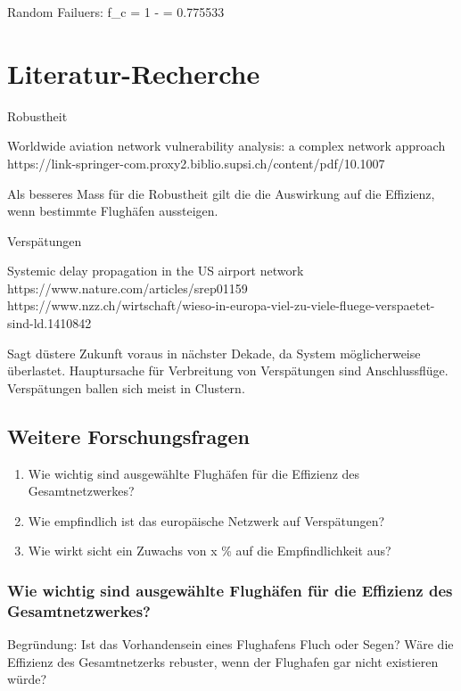 Random Failuers: f_c = 1 -  = 0.775533


\section{Literatur-Recherche}
\label{subsec:literature-research}

Robustheit

\guillemotleft Worldwide aviation network vulnerability analysis: a complex network approach \guillemotright
https://link-springer-com.proxy2.biblio.supsi.ch/content/pdf/10.1007%

Als besseres Mass für die Robustheit gilt die die Auswirkung auf die Effizienz, wenn bestimmte Flughäfen aussteigen.


Verspätungen

\guillemotleft Systemic delay propagation in the US airport network \guillemotright
https://www.nature.com/articles/srep01159
https://www.nzz.ch/wirtschaft/wieso-in-europa-viel-zu-viele-fluege-verspaetet-sind-ld.1410842

Sagt düstere Zukunft voraus in nächster Dekade, da System möglicherweise überlastet.
Hauptursache für Verbreitung von Verspätungen sind Anschlussflüge.
Verspätungen ballen sich meist in Clustern.



\subsection{Weitere Forschungsfragen}
\begin{enumerate}
    \item Wie wichtig sind ausgewählte Flughäfen für die Effizienz des Gesamtnetzwerkes?
    \item Wie empfindlich ist das europäische Netzwerk auf Verspätungen?
    \item Wie wirkt sicht ein Zuwachs von x \% auf die Empfindlichkeit aus?
\end{enumerate}

\subsubsection{Wie wichtig sind ausgewählte Flughäfen für die Effizienz des Gesamtnetzwerkes?}
Begründung: Ist das Vorhandensein eines Flughafens Fluch oder Segen? Wäre die Effizienz des Gesamtnetzerks rebuster, wenn der Flughafen gar nicht existieren würde?

\subsubsection{}
